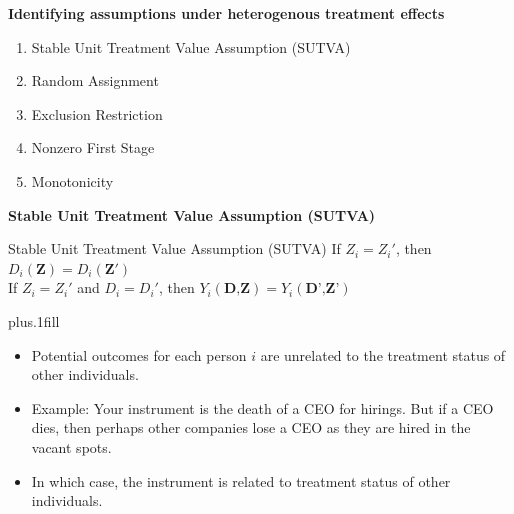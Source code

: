 \documentclass[notes=show]{beamer}
\begin{document}


\begin{frame}[plain]

	\begin{center}
	\textbf{Identifying assumptions under heterogenous treatment effects}
	\end{center}
		
	\begin{enumerate}
	\item Stable Unit Treatment Value Assumption (SUTVA)
	\item Random Assignment
	\item Exclusion Restriction
	\item Nonzero First Stage
	\item Monotonicity
	\end{enumerate}
\end{frame}


\begin{frame}[plain]

	\begin{center}
	\textbf{Stable Unit Treatment Value Assumption (SUTVA)}
	\end{center}
	
	\begin{block}{Stable Unit Treatment Value Assumption (SUTVA)}
	If $Z_i=Z_i'$, then $D_i(\textbf{Z})=D_i(\textbf{Z}')$ \\
	If $Z_i=Z_i'$ and $D_i=D_i'$, then $Y_i(\textbf{D,Z})=Y_i(\textbf{D',Z'})$
	\end{block}
	
 	\vskip3pt plus.1fill

\begin{itemize}
\item Potential outcomes for each person $i$ are unrelated to the treatment status of other individuals.
\item Example:   Your instrument is the death of a CEO for hirings. But if a CEO dies, then perhaps other companies lose a CEO as they are hired in the vacant spots.
\item In which case, the instrument is related to treatment status of other individuals.
\end{itemize}	
		
\end{frame}
\end{document}
